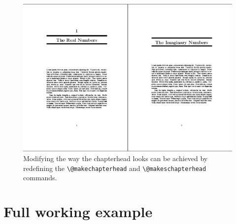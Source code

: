 \begin{figure}[htbp]
\includegraphics[width=\linewidth]{./graphics/chapterhead-17.png}
\caption{Modifying the way the chapterhead looks can be achieved by redefining the \texttt{\textbackslash @makechapterhead} and \texttt{\textbackslash @makeschapterhead} commands.}
\label{fig:chapterhead-17}
\end{figure}

\section*{Full working example}

